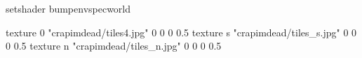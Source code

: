 setshader bumpenvspecworld

texture 0 "crapimdead/tiles4.jpg" 0 0 0 0.5
texture s "crapimdead/tiles_s.jpg" 0 0 0 0.5
texture n "crapimdead/tiles_n.jpg" 0 0 0 0.5

